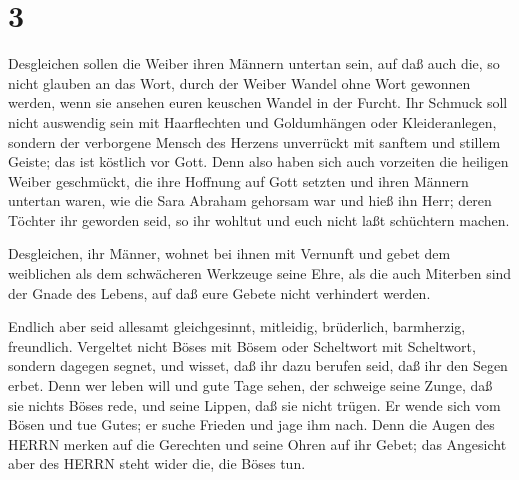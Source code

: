 \hypertarget{section-2}{%
\section{3}\label{section-2}}

 Desgleichen sollen die Weiber ihren Männern untertan sein,
auf daß auch die, so nicht glauben an das Wort, durch der Weiber Wandel
ohne Wort gewonnen werden,  wenn sie ansehen euren keuschen
Wandel in der Furcht.  Ihr Schmuck soll nicht auswendig sein
mit Haarflechten und Goldumhängen oder Kleideranlegen, 
sondern der verborgene Mensch des Herzens unverrückt mit sanftem und
stillem Geiste; das ist köstlich vor Gott.  Denn also haben
sich auch vorzeiten die heiligen Weiber geschmückt, die ihre Hoffnung
auf Gott setzten und ihren Männern untertan waren,  wie die
Sara Abraham gehorsam war und hieß ihn Herr; deren Töchter ihr geworden
seid, so ihr wohltut und euch nicht laßt schüchtern machen.

 Desgleichen, ihr Männer, wohnet bei ihnen mit Vernunft und
gebet dem weiblichen als dem schwächeren Werkzeuge seine Ehre, als die
auch Miterben sind der Gnade des Lebens, auf daß eure Gebete nicht
verhindert werden.

 Endlich aber seid allesamt gleichgesinnt, mitleidig,
brüderlich, barmherzig, freundlich.  Vergeltet nicht Böses
mit Bösem oder Scheltwort mit Scheltwort, sondern dagegen segnet, und
wisset, daß ihr dazu berufen seid, daß ihr den Segen erbet.
 Denn wer leben will und gute Tage sehen, der schweige
seine Zunge, daß sie nichts Böses rede, und seine Lippen, daß sie nicht
trügen.  Er wende sich vom Bösen und tue Gutes; er suche
Frieden und jage ihm nach.  Denn die Augen des HERRN merken
auf die Gerechten und seine Ohren auf ihr Gebet; das Angesicht aber des
HERRN steht wider die, die Böses tun.

